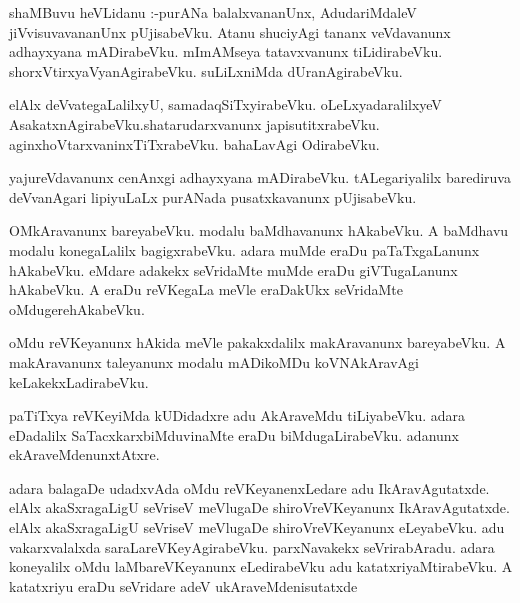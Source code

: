 \documentclass{article}
\begin{document}
\begin{mn}
shaMBuvu  heVLidanu :-purANa balalxvananUnx, AdudariMdaleV  jiVvisuvavananUnx  pUjisabeVku.  Atanu  shuciyAgi  tananx  veVdavanunx  
adhayxyana  mADirabeVku.  mImAMseya  tatavxvanunx  tiLidirabeVku.  shorxVtirxyaVyanAgirabeVku.  suLiLxniMda  dUranAgirabeVku.
\end{mn}

\begin{mn}
elAlx deVvategaLalilxyU,  samadaqSiTxyirabeVku.  oLeLxyadaralilxyeV  AsakatxnAgirabeVku.shatarudarxvanunx  japisutitxrabeVku.  
aginxhoVtarxvaninxTiTxrabeVku.  bahaLavAgi  OdirabeVku.
\end{mn}

\begin{mn}
yajureVdavanunx  cenAnxgi  adhayxyana mADirabeVku.  tALegariyalilx  barediruva  deVvanAgari  lipiyuLaLx  purANada  pusatxkavanunx  pUjisabeVku.  
\end{mn}

\begin{mn}
OMkAravanunx  bareyabeVku.  modalu  baMdhavanunx  hAkabeVku.  A  baMdhavu  modalu  konegaLalilx  bagigxrabeVku.  adara  muMde  eraDu  paTaTxgaLanunx
hAkabeVku.  eMdare  adakekx  seVridaMte  muMde  eraDu  giVTugaLanunx  hAkabeVku.  A  eraDu  reVKegaLa  meVle  eraDakUkx  seVridaMte  oMdugerehAkabeVku.
\end{mn}

\begin{mn}
oMdu  reVKeyanunx  hAkida  meVle  pakakxdalilx  makAravanunx  bareyabeVku.  A  makAravanunx  taleyanunx  modalu  mADikoMDu  
koVNAkAravAgi  keLakekxLadirabeVku.
\end{mn}

\begin{mn}
paTiTxya  reVKeyiMda  kUDidadxre  adu  AkAraveMdu  tiLiyabeVku.  adara  eDadalilx  SaTacxkarxbiMduvinaMte  eraDu  biMdugaLirabeVku.  
adanunx  ekAraveMdenunxtAtxre.
\end{mn}

\begin{mn}
adara  balagaDe  udadxvAda  oMdu  reVKeyanenxLedare  adu  IkAravAgutatxde.  elAlx akaSxragaLigU  seVriseV  meVlugaDe  shiroVreVKeyanunx  IkAravAgutatxde.  elAlx  
akaSxragaLigU  seVriseV  meVlugaDe  shiroVreVKeyanunx  eLeyabeVku.  adu  vakarxvalalxda  saraLareVKeyAgirabeVku.  parxNavakekx  seVrirabAradu.  adara  koneyalilx  
oMdu  laMbareVKeyanunx  eLedirabeVku  adu katatxriyaMtirabeVku.  A  katatxriyu  eraDu  seVridare  adeV  ukAraveMdenisutatxde 
\end{mn}
\end{document}

